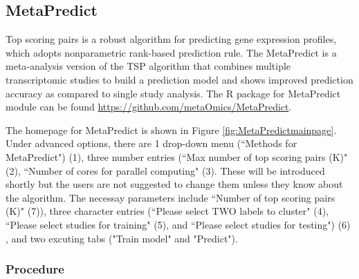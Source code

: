 \subsection{MetaPredict}

Top scoring pairs is a robust algorithm for predicting gene expression profiles,
which adopts nonparametric rank-based prediction rule.
The MetaPredict is a meta-analysis version of the TSP algorithm that combines multiple transcriptomic studies to build a prediction model and shows improved 
prediction accuracy as compared to single study analysis.
The R package for MetaPredict module can be found \url{https://github.com/metaOmics/MetaPredict}.

The homepage for MetaPredict is shown in Figure \ref{fig:MetaPredictmainpage}.
Under advanced options,  there are 1 drop-down menu (``Methods for MetaPredict") {\color{red} (1)}, three number entries (``Max number of top scoring pairs (K)" {\color{red} (2)}, ``Number of cores for parallel computing" {\color{red} (3)}.
These will be introduced shortly but the users are not suggested to change them unless they know about the algorithm.
The necessay parameters include ``Number of top scoring pairs (K)" {\color{red} (7)}), three character entries (``Please select TWO labels to cluster" {\color{red} (4)}, ``Please select studies for training" {\color{red} (5)}, and ``Please select studies for testing") {\color{red} (6)} , and two excuting tabs ("Train model" and "Predict"). 

\subsubsection{Procedure}

